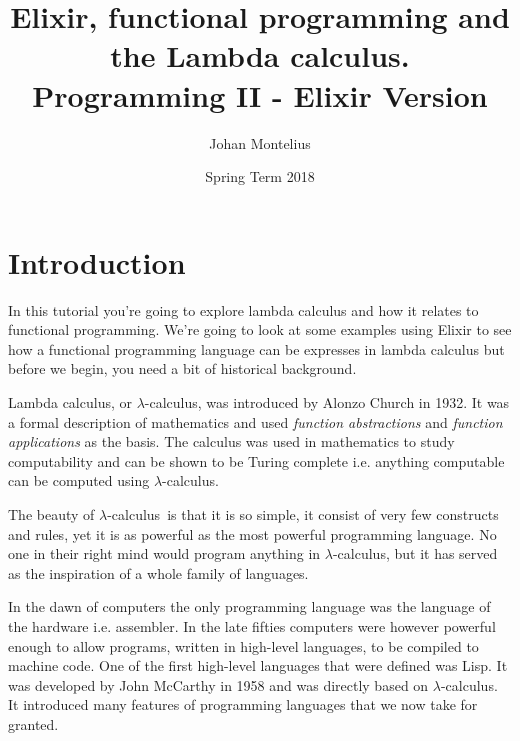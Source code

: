 \documentclass[a4paper,11pt]{article}
\newcommand{\lamc}[0]{$\lambda$-calculus}
\begin{document}

\title{
    \textbf{Elixir, functional programming and\\ the Lambda calculus.}\\
    \large{Programming II - Elixir Version}
}
\author{Johan Montelius}
\date{Spring Term 2018}
\maketitle
{}



\section*{Introduction}

In this tutorial you're going to explore lambda calculus and how it
relates to functional programming. We're going to look at some
examples using Elixir to see how a functional programming language can
be expresses in lambda calculus but before we begin, you need a bit of
historical background.

Lambda calculus, or \lamc, was introduced by Alonzo Church in 1932. It
was a formal description of mathematics and used {\em function abstractions}
and {\em function applications} as the basis. The calculus was used in
mathematics to study computability and can be shown to be Turing
complete i.e. anything computable can be computed using \lamc.


The beauty of \lamc\ is that it is so simple, it consist of very few
constructs and rules, yet it is as powerful as the most powerful
programming language. No one in their right mind would program
anything in \lamc, but it has served as the inspiration of a whole
family of languages.

In the dawn of computers the only programming language was the language of
the hardware i.e. assembler. In the late fifties computers were
however powerful enough to allow programs, written in high-level
languages, to be compiled to machine code. One of the first high-level
languages that were defined was Lisp. It was developed by John
McCarthy in 1958 and was directly based on \lamc. It introduced many
features of programming languages that we now take for granted.
\end{document}
